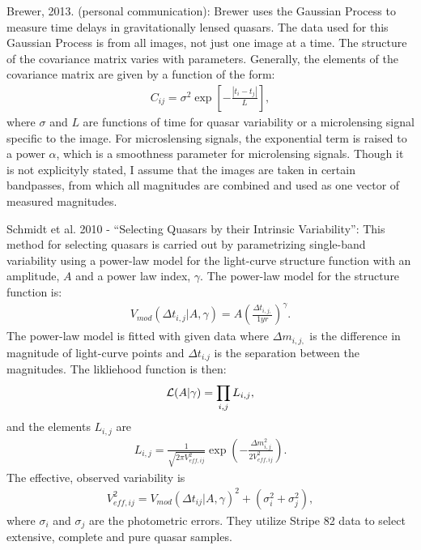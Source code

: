 \documentclass[letterpaper,12pt,preprint]{aastex}
\begin{document}
Brewer, 2013. (personal communication):
Brewer uses the Gaussian Process to measure time delays in gravitationally lensed quasars. The data used for this Gaussian Process is from all images, not just one image at a time. The structure of the covariance matrix varies with parameters. Generally, the elements of the covariance matrix are given by a function of the form:
\begin{eqnarray}
C_{ij}=\sigma^2 \exp\left[-\frac{|t_i-t_j|}{L}\right],
\end{eqnarray}
where $\sigma$ and $L$ are functions of time for quasar variability or a microlensing signal specific to the image. For microslensing signals, the exponential term is raised to a power $\alpha$, which is a smoothness parameter for microlensing signals. Though it is not explicityly stated, I assume that the images are taken in certain bandpasses, from which all magnitudes are combined and used as one vector of measured magnitudes. 

Schmidt et al. 2010 - ``Selecting Quasars by their Intrinsic Variability'':
This method for selecting quasars is carried out by parametrizing single-band variability using a power-law model for the light-curve structure function with an amplitude, $A$ and a power law index, $\gamma$. The power-law model for the structure function is:
\begin{eqnarray}
V_{mod}(\Delta t_{i,j}|A,\gamma)=A\left(\frac{\Delta t_{i,j,}}{1 yr}\right)^{\gamma}.
\end {eqnarray}
The power-law model is fitted with given data where $\Delta m_{i,j,}$ is the difference in magnitude of light-curve points and $\Delta t_{i.j}$ is the separation between the magnitudes. The likliehood function is then:
\begin{eqnarray}
{\cal L}(A|\gamma)= \prod_{i,j} L_{i,j}, 
\end{eqnarray}
and the elements $L_{i,j}$ are
\begin{eqnarray}
L_{i,j}=\frac{1}{\sqrt{2\pi V_{eff,ij}^2}}\exp\left(-\frac{\Delta m_{i,j}^2}{2V_{eff,ij}^2} \right).
\end{eqnarray}
The effective, observed variability is
\begin{eqnarray}
V_{eff,ij}^2=V_{mod}(\Delta t_{ij}|A,\gamma)^2+ (\sigma_i^2 + \sigma_j^2), 
\end{eqnarray} 
where $\sigma_i$ and $\sigma_j$ are the photometric errors. They utilize Stripe 82 data to select extensive, complete and pure quasar samples.
\end{document}

